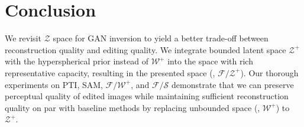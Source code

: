 \documentclass[10pt,twocolumn,letterpaper]{article}
\newcommand{\FWS}{\mathcal{F}/\mathcal{W}^{+}}
\newcommand{\WPS}{\mathcal{W}^{+}}
\newcommand{\ZS}{\mathcal{Z}}
\newcommand{\ZPS}{\mathcal{Z}^{+}}
\newcommand{\FZS}{\mathcal{F}/\mathcal{Z}^{+}}
\newcommand{\FSS}{\mathcal{F}/\mathcal{S}}
\begin{document}
 \section{Conclusion}
 \label{sec:conclusion}

We revisit $\ZS$ space for GAN inversion to yield a better trade-off between reconstruction quality and editing quality. We integrate bounded latent space $\ZPS$ with the hyperspherical prior instead of $\WPS$ into the space with rich representative capacity, resulting in the presented space (\eg, $\FZS$). Our thorough experiments on PTI, SAM, $\FWS$, and $\FSS$ demonstrate that we can preserve perceptual quality of edited images while maintaining sufficient reconstruction quality on par with baseline methods by replacing unbounded space (\eg, $\WPS$) to $\ZPS$.


{\small


}
\end{document}
